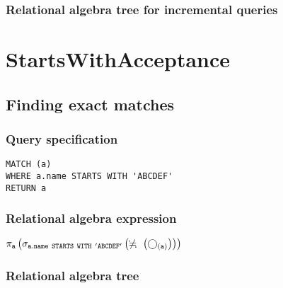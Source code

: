 \subsubsection*{Relational algebra tree for incremental queries}


\section{StartsWithAcceptance}

\subsection{Finding exact matches}

\subsubsection*{Query specification}

\begin{lstlisting}
MATCH (a)
WHERE a.name STARTS WITH 'ABCDEF'
RETURN a
\end{lstlisting}

\subsubsection*{Relational algebra expression}

$\projection{\var{a}} \left(\selection{\mathtt{a.name~STARTS~WITH~'ABCDEF'}} \left(\alldifferent{} \left(\getvertices{a}{}\right)\right)\right)$

\subsubsection*{Relational algebra tree}


